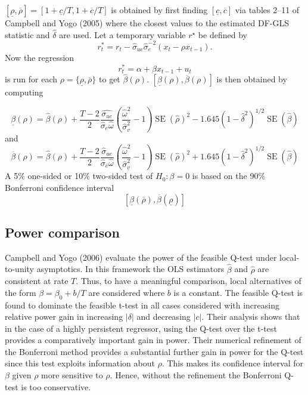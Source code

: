 \documentclass{article}
\begin{document}
$[\underline{\rho}, \overline{\rho}]=[1+\underline{c} / T, 1+\overline{c} / T]$ is obtained by first finding $[\underline{c}, \overline{c}]$ via tables 2–11 of Campbell and Yogo (2005) where the closest values to the estimated DF-GLS statistic and $\hat{\delta}$ are used. Let a temporary variable $r^{\star}$ be defined by
\begin{equation}
r_{t}^{*}=r_{t}-\widehat{\sigma}_{u e} \widehat{\sigma}_{e}^{-2}\left(x_{t}-\rho x_{t-1}\right).
\end{equation}
Now the regression
\begin{equation}
r_{t}^{*}=\alpha+\beta x_{t-1}+u_{t}
\end{equation} 
is run for each $\rho=\{\underline{\rho}, \overline{\rho}\}$ to get $\widehat{\beta}(\rho)$. $[\underline{\beta}(\rho), \overline{\beta}(\rho)]$ is then obtained by computing

\begin{equation}
\underline{\beta}(\rho)=\widehat{\beta}(\rho)+\frac{T-2}{2} \frac{\widehat{\sigma_{ue}}}{\widehat{\sigma}_{e} \widehat{\omega}}\left(\frac{\widehat{\omega}^{2}}{\widehat{\sigma}_{v}^{2}}-1\right) \operatorname{SE}(\widehat{\rho})^{2}-1.645\left(1-\widehat{\delta}^{2}\right)^{1 / 2} \operatorname{SE}(\widehat{\beta})
\end{equation}
and 
\begin{equation}
\overline{\beta}(\rho)=\widehat{\beta}(\rho)+\frac{T-2}{2} \frac{\widehat{\sigma}_{u e}}{\widehat{\sigma}_{e} \widehat{\omega}}\left(\frac{\widehat{\omega}^{2}}{\widehat{\sigma}_{v}^{2}}-1\right) \operatorname{SE}(\widehat{\rho})^{2}+1.645\left(1-\widehat{\delta}^{2}\right)^{1 / 2} \operatorname{SE}(\widehat{\beta})
\end{equation}
A 5\% one-sided or 10\% two-sided test of $H_0: \beta = 0$ is based on the 90\% Bonferroni confidence interval
$$[\underline{\beta}(\overline{\rho}), \overline{\beta}(\underline{\rho})]$$
\subsection{Power comparison}
\label{power}
Campbell and Yogo (2006) evaluate the power of the feasible Q-test under local-to-unity asymptotics. In this framework the OLS estimators $\hat{\beta}$ and $\hat{\rho}$ are consistent at rate $T$. Thus, to have a meaningful comparison, local alternatives of the form $\beta = \beta_0 + b/T$ are considered where $b$ is a constant. The feasible Q-test is found to dominate the feasible t-test in all cases considered with increasing relative power gain in increasing $|\delta|$ and decreasing $|c|$. Their analysis shows that in the case of a highly persistent regressor, using the Q-test over the t-test provides a comparatively important gain in power. Their numerical refinement of the Bonferroni method provides a substantial further gain in power for the Q-test since this test exploits information about $\rho$. This makes its confidence interval for $\beta$ given $\rho$ more sensitive to $\rho$. Hence, without the refinement the Bonferroni Q-test is too conservative.
\end{document}
